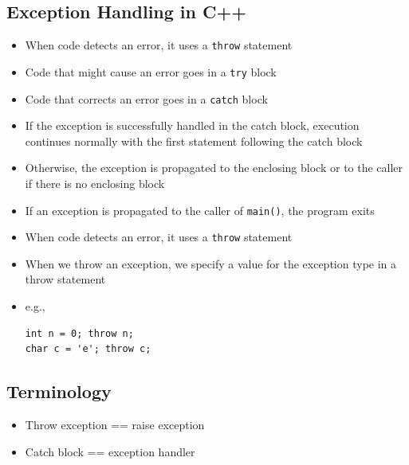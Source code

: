 \subsection{Exception Handling in C++}
\begin{itemize}
	\item When code detects an error, it uses a \lstinline[style=C++]{throw} statement
	\item Code that might cause an error goes in a \lstinline[style=C++]{try} block
	\item Code that corrects an error goes in a \lstinline[style=C++]{catch} block
	\item If the exception is successfully handled in the catch block, execution continues normally with the first statement following the catch block
	\item Otherwise, the exception is propagated to the enclosing block or to the caller if there is no enclosing block
	\item If an exception is propagated to the caller of \lstinline[style=C++]{main()}, the program exits
	\item When code detects an error, it uses a \lstinline[style=C++]{throw} statement
	\item When we throw an exception, we specify a value for the exception type in a throw statement
	\item e.g.,
\begin{lstlisting}[style=C++]
int n = 0; throw n;
char c = 'e'; throw c;
\end{lstlisting}
\end{itemize}

\subsection{Terminology}
\begin{itemize}
	\item Throw exception == raise exception
	\item Catch block == exception handler
\end{itemize}

